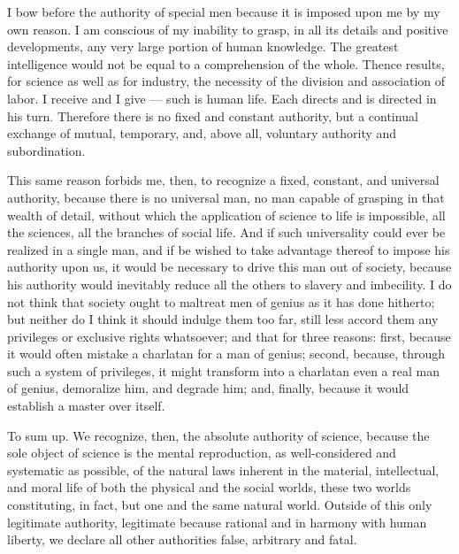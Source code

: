 \documentclass[12pt]{report}
\begin{document}
I bow before the authority of special men because it is imposed upon me by my own reason. I am conscious of my inability to grasp, in all its details and positive developments, any very large portion of human knowledge. The greatest intelligence would not be equal to a comprehension of the whole. Thence results, for science as well as for industry, the necessity of the division and association of labor. I receive and I give — such is human life. Each directs and is directed in his turn. Therefore there is no fixed and constant authority, but a continual exchange of mutual, temporary, and, above all, voluntary authority and subordination.


This same reason forbids me, then, to recognize a fixed, constant, and universal authority, because there is no universal man, no man capable of grasping in that wealth of detail, without which the application of science to life is impossible, all the sciences, all the branches of social life. And if such universality could ever be realized in a single man, and if be wished to take advantage thereof to impose his authority upon us, it would be necessary to drive this man out of society, because his authority would inevitably reduce all the others to slavery and imbecility. I do not think that society ought to maltreat men of genius as it has done hitherto; but neither do I think it should indulge them too far, still less accord them any privileges or exclusive rights whatsoever; and that for three reasons: first, because it would often mistake a charlatan for a man of genius; second, because, through such a system of privileges, it might transform into a charlatan even a real man of genius, demoralize him, and degrade him; and, finally, because it would establish a master over itself.


To sum up. We recognize, then, the absolute authority of science, because the sole object of science is the mental reproduction, as well-considered and systematic as possible, of the natural laws inherent in the material, intellectual, and moral life of both the physical and the social worlds, these two worlds constituting, in fact, but one and the same natural world. Outside of this only legitimate authority, legitimate because rational and in harmony with human liberty, we declare all other authorities false, arbitrary and fatal.
\end{document}
